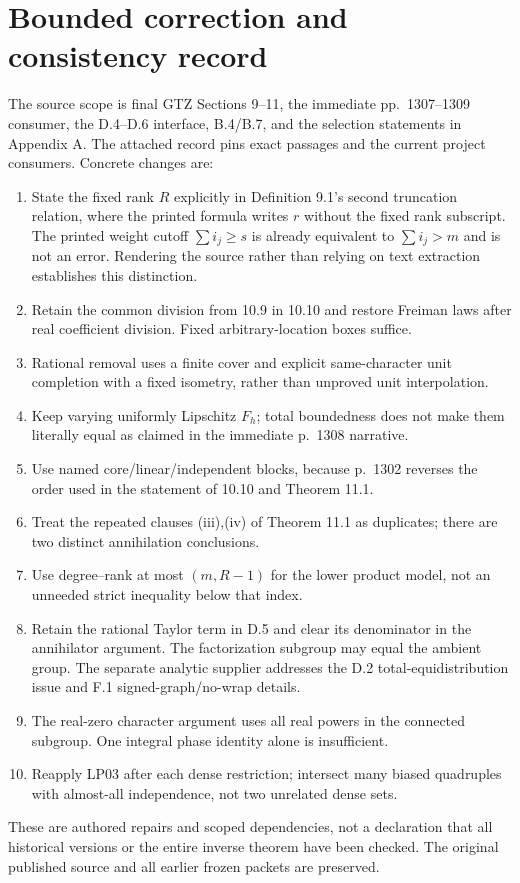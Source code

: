 \documentclass[11pt]{article}
\begin{document}
\section{Bounded correction and consistency record}
The source scope is final GTZ Sections 9--11, the immediate pp.~1307--1309
consumer, the D.4--D.6 interface, B.4/B.7, and the selection statements in
Appendix A. The attached record pins exact passages and the current project
consumers. Concrete changes are:
\begin{enumerate}
\item State the fixed rank $R$ explicitly in Definition 9.1's second
truncation relation, where the printed formula writes $r$ without the fixed
rank subscript. The printed weight cutoff $\sum i_j\geq s$ is already
equivalent to $\sum i_j>m$ and is not an error. Rendering the source rather
than relying on text extraction establishes this distinction.
\item Retain the common division from 10.9 in 10.10 and restore Freiman laws
after real coefficient division. Fixed arbitrary-location boxes suffice.
\item Rational removal uses a finite cover and explicit same-character unit
completion with a fixed isometry, rather than unproved unit interpolation.
\item Keep varying uniformly Lipschitz $F_h$; total boundedness does not make
them literally equal as claimed in the immediate p.~1308 narrative.
\item Use named core/linear/independent blocks, because p.~1302 reverses the
order used in the statement of 10.10 and Theorem 11.1.
\item Treat the repeated clauses (iii),(iv) of Theorem 11.1 as duplicates;
there are two distinct annihilation conclusions.
\item Use degree--rank at most $(m,R-1)$ for the lower product model, not an
unneeded strict inequality below that index.
\item Retain the rational Taylor term in D.5 and clear its denominator in
the annihilator argument. The factorization subgroup may equal the ambient
group. The separate analytic supplier addresses the D.2 total-equidistribution
issue and F.1 signed-graph/no-wrap details.
\item The real-zero character argument uses all real powers in the connected
subgroup. One integral phase identity alone is insufficient.
\item Reapply LP03 after each dense restriction; intersect many biased
quadruples with almost-all independence, not two unrelated dense sets.
\end{enumerate}
These are authored repairs and scoped dependencies, not a declaration that
all historical versions or the entire inverse theorem have been checked.
The original published source and all earlier frozen packets are preserved.
\end{document}
